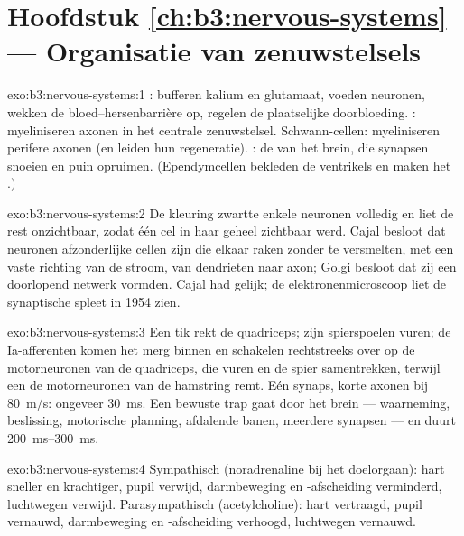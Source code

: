 \section*{Hoofdstuk \ref{ch:b3:nervous-systems} --- Organisatie van zenuwstelsels}

\begin{solution}{exo:b3:nervous-systems:1}
: bufferen kalium en glutamaat, voeden neuronen, wekken de
bloed--hersenbarrière op, regelen de plaatselijke doorbloeding.
: myeliniseren axonen in het centrale zenuwstelsel.
Schwann-cellen: myeliniseren perifere axonen (en leiden hun
regeneratie). : de  van het brein, die synapsen
snoeien en puin opruimen. (Ependymcellen bekleden de ventrikels en
maken het .)
\end{solution}

\begin{solution}{exo:b3:nervous-systems:2}
De kleuring zwartte enkele neuronen volledig en liet de rest
onzichtbaar, zodat één cel in haar geheel zichtbaar werd. Cajal besloot
dat neuronen afzonderlijke cellen zijn die elkaar raken zonder te
versmelten, met een vaste richting van de stroom, van dendrieten naar
axon; Golgi besloot dat zij een doorlopend netwerk vormden. Cajal had
gelijk; de elektronenmicroscoop liet de synaptische spleet in 1954 zien.
\end{solution}

\begin{solution}{exo:b3:nervous-systems:3}
Een tik rekt de quadriceps; zijn spierspoelen vuren; de Ia-afferenten
komen het merg binnen en schakelen rechtstreeks over op de
motorneuronen van de quadriceps, die vuren en de spier samentrekken,
terwijl een  de motorneuronen van de hamstring remt. Eén
synaps, korte axonen bij \qty{80}{m/s}: ongeveer \qty{30}{ms}. Een
bewuste trap gaat door het brein --- waarneming, beslissing, motorische
planning, afdalende banen, meerdere synapsen --- en duurt
\qtyrange{200}{300}{ms}.
\end{solution}

\begin{solution}{exo:b3:nervous-systems:4}
Sympathisch (noradrenaline bij het doelorgaan): hart sneller en
krachtiger, pupil verwijd, darmbeweging en -afscheiding verminderd,
luchtwegen verwijd. Parasympathisch (acetylcholine): hart vertraagd,
pupil vernauwd, darmbeweging en -afscheiding verhoogd, luchtwegen
vernauwd.
\end{solution}

